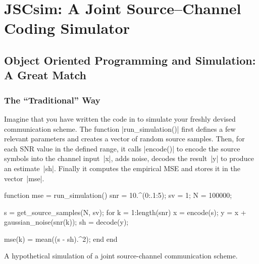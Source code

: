 \chapter{JSCsim: A Joint Source--Channel Coding Simulator}
\label{ch:simulator}

\DefineShortVerb{\|}


\section[Object Oriented Programming for Simulations]{Object Oriented
Programming and Simulation: A Great Match}\label{sec:ooforsim}

\subsection{The ``Traditional'' Way}

Imagine that you have written the code in  to simulate
your freshly devised communication scheme. The function |run_simulation()|
first defines a few relevant parameters and creates a vector of random source
samples. Then, for each SNR value in the defined range, it calls |encode()| to
encode the source symbols into the channel input~|x|, adds noise, decodes the
result~|y|  to produce an estimate~|sh|.  Finally it computes the empirical MSE
and stores it in the vector~|mse|.

\begin{listing}
\begin{Code}
  function mse = run_simulation()
    snr = 10.^(0:.1:5);   %
    sv  = 1;              %
    N   = 100000;         %
    
    s = get_source_samples(N, sv);
    for k = 1:length(snr)
      x  = encode(s);
      y  = x + gaussian_noise(snr(k));
      sh = decode(y);
      
      mse(k) = mean((s - sh).^2);
    end
  end
\end{Code}
\caption{A hypothetical simulation of a joint source-channel communication
scheme.}
\label{lst:proceduralsim}
\end{listing}


